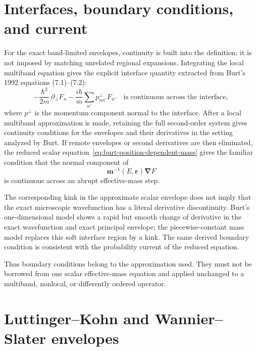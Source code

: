 \section{Interfaces, boundary conditions, and current}

For the exact band-limited envelopes, continuity is built into the definition;
it is not imposed by matching unrelated regional expansions. Integrating the
local multiband equation gives the explicit interface quantity extracted from
Burt's 1992 equations (7.1)--(7.2):
\begin{equation}
  -\frac{\hbar^2}{2m}\,\partial_{\perp}F_n
  -\frac{i\hbar}{m}\sum_{n'}p^{\perp}_{nn'}F_{n'}
  \quad\text{is continuous across the interface},
  \label{eq:burt-interface-flux}
\end{equation}
where $p^{\perp}$ is the momentum component normal to the interface. After a local
multiband approximation is made, retaining the full second-order system gives
continuity conditions for the envelopes and their derivatives in the setting
analyzed by Burt. If remote envelopes or second derivatives are then eliminated,
the reduced scalar equation~\eqref{eq:burt-position-dependent-mass} gives the
familiar condition that the normal component of
\begin{equation}
  \mathbf m^{-1}(E,\mathbf r)\boldsymbol\nabla F
\end{equation}
is continuous across an abrupt effective-mass step.

The corresponding kink in the approximate scalar envelope does not imply that
the exact microscopic wavefunction has a literal derivative discontinuity.
Burt's one-dimensional model shows a rapid but smooth change of derivative in
the exact wavefunction and exact principal envelope; the piecewise-constant
mass model replaces this soft interface region by a kink. The same derived
boundary condition is consistent with the probability current of the reduced
equation.

Thus boundary conditions belong to the approximation used. They must not be
borrowed from one scalar effective-mass equation and applied unchanged to a
multiband, nonlocal, or differently ordered operator.

\section{Luttinger--Kohn and Wannier--Slater envelopes}

